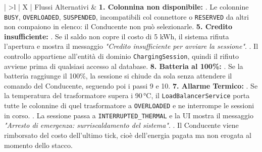 \begin{xltabular}{\textwidth}{| >{\bfseries}l | X |}
Flussi Alternativi &
\textbf{1. Colonnina non disponibile:} . Le colonnine \texttt{BUSY}, \texttt{OVERLOADED}, \texttt{SUSPENDED}, incompatibili col connettore o \texttt{RESERVED} da altri non compaiono in elenco: il Conducente non può selezionarle. \newline\newline
\textbf{5. Credito insufficiente:} . Se il saldo non copre il costo di 5 kWh, il sistema rifiuta l'apertura e mostra il messaggio \textit{"Credito insufficiente per avviare la sessione"}. . Il controllo appartiene all'entità di dominio \texttt{ChargingSession}, quindi il rifiuto avviene prima di qualsiasi accesso al database. \newline\newline
\textbf{8. Batteria al 100\%:} . Se la batteria raggiunge il 100\%, la sessione si chiude da sola senza attendere il comando del Conducente, seguendo poi i passi 9 e 10. \newline\newline
\textbf{7. Allarme Termico:} . Se la temperatura del trasformatore supera i 90\,°C, il \texttt{LoadBalancerService} porta tutte le colonnine di quel trasformatore a \texttt{OVERLOADED} e ne interrompe le sessioni in corso. . La sessione passa a \texttt{INTERRUPTED\_THERMAL} e la UI mostra il messaggio \textit{"Arresto di emergenza: surriscaldamento del sistema"}. . Il Conducente viene rimborsato del costo dell'ultimo tick, cioè dell'energia pagata ma non erogata al momento dello stacco. \\ \hline

\end{xltabular}
